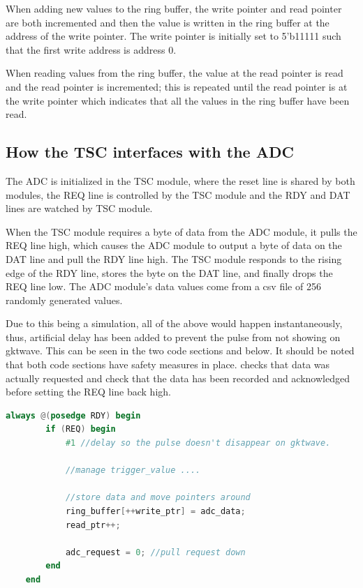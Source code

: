 When adding new values to the ring buffer, the write pointer and read pointer are both incremented and then the value is written in the ring buffer at the address of the write pointer.
The write pointer is initially set to 5'b11111 such that the first write address is address 0.

When reading values from the ring buffer, the value at the read pointer is read and the read pointer is incremented; this is repeated until the read pointer is at the write pointer which indicates that all the values in the ring buffer have been read.

\subsection{How the TSC interfaces with the ADC}
The ADC is initialized in the TSC module, where the reset line is shared by both modules, the REQ line is controlled by the TSC module and the RDY and DAT lines are watched by TSC module.

When the TSC module requires a byte of data from the ADC module, it pulls the REQ line high, which causes the ADC module to output a byte of data on the DAT line and pull the RDY line high.
The TSC module responds to the rising edge of the RDY line, stores the byte on the DAT line, and finally drops the REQ line low.
The ADC module's data values come from a csv file of 256 randomly generated values.

Due to this being a simulation, all of the above would happen instantaneously, thus, artificial delay has been added to prevent the pulse from not showing on gktwave.
This can be seen in the two code sections  and  below.
It should be noted that both code sections have safety measures in place.
 checks that data was actually requested and  check that the data has been recorded and acknowledged before setting the REQ line back high.


\begin{lstlisting}[language=Verilog, caption={Verilog code for storing data and moving pointers on the posedge of RDY}, label={lst:posedgerdy}]
    always @(posedge RDY) begin
        if (REQ) begin
            #1 //delay so the pulse doesn't disappear on gktwave.
          
            //manage trigger_value ....

            //store data and move pointers around
            ring_buffer[++write_ptr] = adc_data;
            read_ptr++;

            adc_request = 0; //pull request down
        end
    end
\end{lstlisting}


